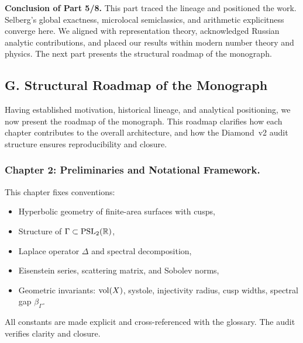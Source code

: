 \medskip

\noindent\textbf{Conclusion of Part 5/8.}
This part traced the lineage and positioned the work.
Selberg’s global exactness, microlocal semiclassics, and arithmetic explicitness
converge here. We aligned with representation theory,
acknowledged Russian analytic contributions,
and placed our results within modern number theory and physics.
The next part presents the structural roadmap of the monograph.


\subsection*{G. Structural Roadmap of the Monograph}

Having established motivation, historical lineage, and analytical positioning,
we now present the roadmap of the monograph.
This roadmap clarifies how each chapter contributes to the overall architecture,
and how the Diamond~v2 audit structure ensures reproducibility and closure.

\subsubsection*{Chapter 2: Preliminaries and Notational Framework.}
This chapter fixes conventions:
\begin{itemize}
  \item Hyperbolic geometry of finite-area surfaces with cusps,
  \item Structure of $\Gamma \subset \operatorname{PSL}_2(\mathbb{R})$,
  \item Laplace operator $\Delta$ and spectral decomposition,
  \item Eisenstein series, scattering matrix, and Sobolev norms,
  \item Geometric invariants: $\operatorname{vol}(X)$, systole, injectivity radius,
        cusp widths, spectral gap $\beta_\Gamma$.
\end{itemize}
All constants are made explicit and cross-referenced with the glossary.
The audit verifies clarity and closure.

